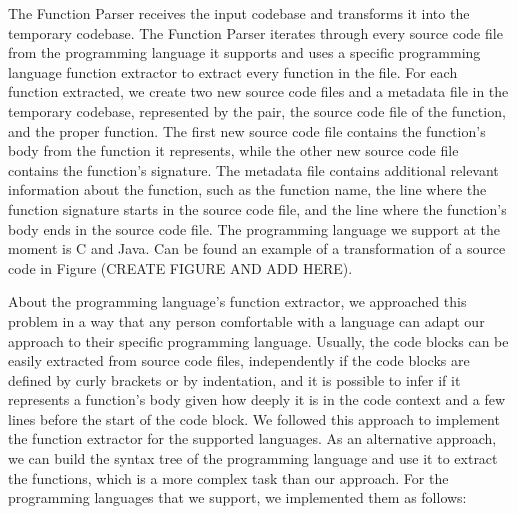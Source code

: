 The Function Parser receives the input codebase and transforms it into the temporary codebase. The 
Function Parser iterates through every source code file from the programming language it supports 
and uses a specific programming language function extractor to extract every function in the file. 
For each function extracted, we create two new source code files and a metadata file in the temporary 
codebase, represented by the pair,  the source code file of the function, and the proper function. 
The first new source code file contains the function’s body from the function it represents, while 
the other new source code file contains the function’s signature. The metadata file contains 
additional relevant information about the function, such as the function name, the line where the 
function signature starts in the source code file, and the line where the function’s body ends in 
the source code file. The programming language we support at the moment is C and Java. Can be found 
an example of a transformation of a source code in Figure (CREATE FIGURE AND ADD HERE).

About the programming language’s function extractor, we approached this problem in a way that any 
person comfortable with a language can adapt our approach to their specific programming language. 
Usually, the code blocks can be easily extracted from source code files, independently if the code 
blocks are defined by curly brackets or by indentation, and it is possible to infer if it represents 
a function’s body given how deeply it is in the code context and a few lines before the start of the 
code block. We followed this approach to implement the function extractor for the supported languages. 
As an alternative approach, we can build the syntax tree \citep{compiler} 
of the programming language and use it to extract the functions, which is a more complex task than 
our approach. For the programming languages that we support, we implemented them as follows:

